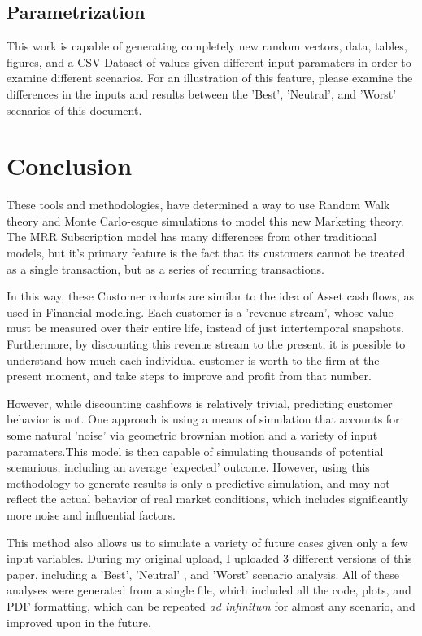 \documentclass[11pt]{article}
\begin{document}
\subsection*{Parametrization}

This work is capable of generating completely new random vectors, data, tables, figures, and a CSV Dataset of values given different input paramaters in order to examine different scenarios. For an illustration of this feature, please examine the differences in the inputs and results between the 'Best', 'Neutral', and 'Worst' scenarios of this document. 

\newpage

\section*{Conclusion}

These tools and methodologies, have determined a way to use Random Walk theory and Monte Carlo-esque simulations to model this new Marketing theory. The MRR Subscription model has many differences from other traditional models, but it's primary feature is the fact that its customers cannot be treated as a single transaction, but as a series of recurring transactions.

In this way, these Customer cohorts are similar to the idea of Asset cash flows, as used in Financial modeling. Each customer is a 'revenue stream', whose value must be measured over their entire life, instead of just intertemporal snapshots. Furthermore, by discounting this revenue stream to the present, it is possible to understand how much each individual customer is worth to the firm at the present moment, and take steps to improve and profit from that number.

However, while discounting cashflows is relatively trivial, predicting customer behavior is not. One approach is using a means of simulation that accounts for some natural 'noise' via geometric brownian motion and a variety of input paramaters.This model is then capable of simulating thousands of potential scenarious, including an average 'expected' outcome. However, using this methodology to generate results is only a predictive simulation, and may not reflect the actual behavior of real market conditions, which includes significantly more noise and influential factors. 

This method also allows us to simulate a variety of future cases given only a few input variables. During my original upload, I uploaded 3 different versions of this paper, including a 'Best', 'Neutral' , and 'Worst' scenario analysis. All of these analyses were generated from a single file, which included all the code, plots, and PDF formatting, which can be repeated \textit{ad infinitum} for almost any scenario, and improved upon in the future. 
\end{document}

